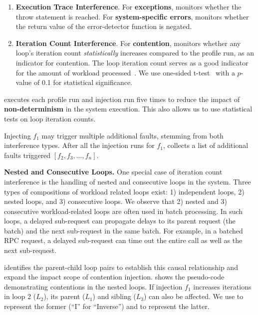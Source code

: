 \begin{enumerate}[wide, labelwidth=!, labelindent=\parindent, noitemsep, topsep=0pt]
\item \textbf{Execution Trace Interference}. 
For \textbf{exceptions}, 
\tool monitors whether the throw statement is reached. 
For \textbf{system-specific errors}, 
\tool monitors whether 
the return value of the error-detector function is negated. 

\item \textbf{Iteration Count Interference}. 
For \textbf{contention}, 
\tool monitors whether any loop's iteration count \textit{statistically} increases compared to the profile run, 
as an indicator for contention. 
The loop iteration count serves as a good indicator for the amount of workload processed~\cite{li2018pcatch}. 
We use one-sided t-test~\cite{student1908probable} with a $p$-value of 0.1 for statistical significance.

\end{enumerate}

\tool executes each profile run and injection run five times to reduce the impact of \textbf{non-determinism} in the system execution. This also allows us to use statistical tests on loop iteration counts.


Injecting $f_1$ may trigger multiple additional faults, stemming from both interference types. After all the injection runs for $f_1$, \tool collects a list of additional faults triggered $[f_2, f_3, ..., f_n]$. 



\textbf{Nested and Consecutive Loops.}
One special case of iteration count interference is the handling of nested and consecutive loops in the system. 
Three types of compositions of workload related loops exist: 1) independent loops, 2) nested loops, and 3) consecutive loops. 
We observe that 2) nested and 3) consecutive workload-related loops are often used in batch processing. 
In such loops, 
a delayed sub-request 
can propagate delays to its parent request (the batch) 
and the next sub-request in the same batch.  
For example, in a batched RPC request, a delayed sub-request can time out the entire call as well as the next sub-request.



\tool identifies the parent-child loop pairs 
to establish this causal relationship and expand the impact scope of contention injection.
 shows the pseudo-code demonstrating contentions in the nested loops. 
If injection $f_1$ increases iterations in loop 2 ($L_2$), its parent ($L_1$) and sibling ($L_3$) can also be affected.
We use  to represent the former (``I'' for ``Inverse'') and  to represent the latter. 

